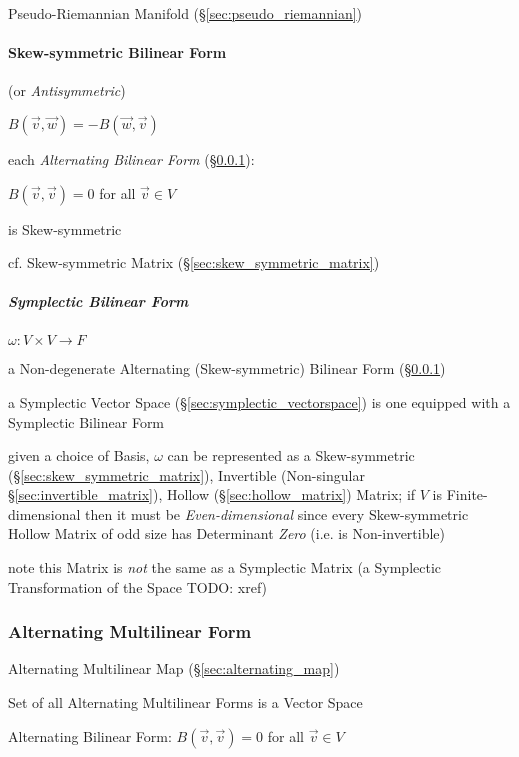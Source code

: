 {{Pseudo-Riemannian Manifold (\S\ref{sec:pseudo_riemannian})



\paragraph{Skew-symmetric Bilinear Form}
\label{sec:skew_symmetric_bilinear}\hfill

(or \emph{Antisymmetric})

$B(\vec{v},\vec{w}) = -B(\vec{w},\vec{v})$

each \emph{Alternating Bilinear Form} (\S\ref{sec:alternating_form}):

$B(\vec{v},\vec{v}) = 0$ for all $\vec{v} \in V$

is Skew-symmetric

\fist cf. Skew-symmetric Matrix (\S\ref{sec:skew_symmetric_matrix})



\subparagraph{Symplectic Bilinear Form}\label{sec:symplectic_bilinear}\hfill

$\omega : V \times V \rightarrow F$

a Non-degenerate Alternating (Skew-symmetric) Bilinear Form
(\S\ref{sec:alternating_form})

a Symplectic Vector Space (\S\ref{sec:symplectic_vectorspace}) is one equipped
with a Symplectic Bilinear Form

given a choice of Basis, $\omega$ can be represented as a Skew-symmetric
(\S\ref{sec:skew_symmetric_matrix}), Invertible (Non-singular
\S\ref{sec:invertible_matrix}), Hollow (\S\ref{sec:hollow_matrix}) Matrix; if
$V$ is Finite-dimensional then it must be \emph{Even-dimensional} since every
Skew-symmetric Hollow Matrix of odd size has Determinant \emph{Zero} (i.e. is
Non-invertible)

note this Matrix is \emph{not} the same as a Symplectic Matrix (a Symplectic
Transformation of the Space TODO: xref)



\subsubsection{Alternating Multilinear Form}\label{sec:alternating_form}

Alternating Multilinear Map (\S\ref{sec:alternating_map})

Set of all Alternating Multilinear Forms is a Vector Space

Alternating Bilinear Form: $B(\vec{v},\vec{v}) = 0$ for all $\vec{v} \in V$

}}
